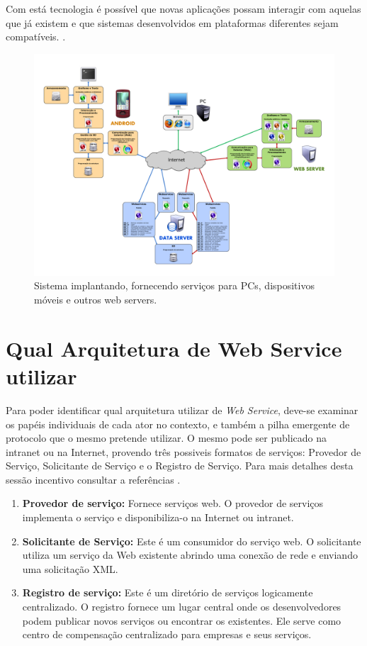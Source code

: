 \documentclass[12pt]{article}
\begin{document}
Com está tecnologia é possível que novas aplicações possam interagir com aquelas que já existem e que sistemas desenvolvidos em plataformas diferentes sejam compatíveis. 
 \cite{webservece}.
\begin{figure}[H]
	\centering
	\includegraphics[scale=0.14]{Imagens/webservice.png}
	\caption{Sistema implantando, fornecendo serviços para PCs, dispositivos móveis e outros web servers.}
	\label{wbs}
\end{figure}  
\section{Qual Arquitetura de Web Service utilizar}
Para poder identificar qual arquitetura utilizar de \textit{Web Service}, deve-se examinar os papéis individuais de cada ator no contexto, e também a pilha emergente de protocolo que o mesmo pretende utilizar.
O mesmo pode ser publicado na intranet ou na Internet, provendo três possiveis formatos de serviços: Provedor de Serviço, Solicitante de Serviço e o Registro de Serviço.
Para mais detalhes desta sessão incentivo consultar a referências \cite{tutorial}. 

\begin{enumerate}
	\item \textbf{Provedor de serviço:}
	Fornece serviços web. O provedor de serviços implementa o serviço e disponibiliza-o na Internet ou intranet.
	\item \textbf{Solicitante de Serviço:}
	Este é um consumidor do serviço web. O solicitante utiliza um serviço da Web existente abrindo uma conexão de rede e enviando uma solicitação XML.
	\item \textbf{Registro de serviço:}
	Este é um diretório de serviços logicamente centralizado. O registro fornece um lugar central onde os desenvolvedores podem publicar novos serviços ou encontrar os existentes. Ele serve como centro de compensação centralizado para empresas e seus serviços.
\end{enumerate}
\end{document}
